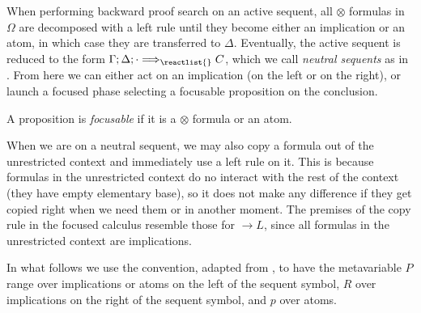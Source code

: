 When performing backward proof search on an active sequent, all $\otimes$
formulas in $\Omega$ are decomposed with a left rule until they become either an
implication or an atom, in which case they are transferred to
$\Delta$. Eventually, the active sequent is reduced to the form
$\ztriseq{\Gamma}{\Delta}{\cdot}{\reactlist{}}{C}$, which we call \emph{neutral
  sequents} as in \cite{chaudhuri-thesis}. From here we can either act on an
implication (on the left or on the right), or launch a focused phase selecting a
focusable proposition on the conclusion.

\begin{definition}
  A proposition is \emph{focusable} if it is a $\otimes$ formula or an atom.
\end{definition}

When we are on a neutral sequent, we may also copy a formula out of the
unrestricted context and immediately use a left rule on it. This is because
formulas in the unrestricted context do no interact with the rest of the context
(they have empty elementary base), so it does not make any difference if they
get copied right when we need them or in another moment. The premises of the
copy rule in the focused calculus resemble those for $\rightarrow L$, since all
formulas in the unrestricted context are implications.

In what follows we use the convention, adapted from \cite{chaudhuri-thesis}, to
have the metavariable $P$ range over implications or atoms on the left of the
sequent symbol, $R$ over implications on the right of the sequent symbol, and
$p$ over atoms.

